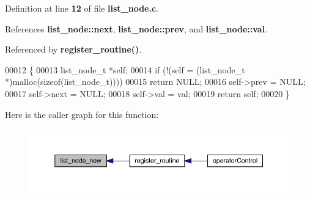 Definition at line \textbf{ 12} of file \textbf{ list\+\_\+node.\+c}.



References \textbf{ list\+\_\+node\+::next}, \textbf{ list\+\_\+node\+::prev}, and \textbf{ list\+\_\+node\+::val}.



Referenced by \textbf{ register\+\_\+routine()}.


\begin{DoxyCode}
00012                                       \{
00013   list_node_t *\textcolor{keyword}{self};
00014   \textcolor{keywordflow}{if} (!(\textcolor{keyword}{self} = (list_node_t *)malloc(\textcolor{keyword}{sizeof}(list_node_t))))
00015     \textcolor{keywordflow}{return} NULL;
00016   \textcolor{keyword}{self}->prev = NULL;
00017   \textcolor{keyword}{self}->next = NULL;
00018   \textcolor{keyword}{self}->val = val;
00019   \textcolor{keywordflow}{return} \textcolor{keyword}{self};
00020 \}
\end{DoxyCode}
Here is the caller graph for this function\+:\nopagebreak
\begin{figure}[H]
\begin{center}
\leavevmode
\includegraphics[width=350pt]{list__node_8c_a4ef36e0519514ac481d0d7e0b439d431_icgraph}
\end{center}
\end{figure}
